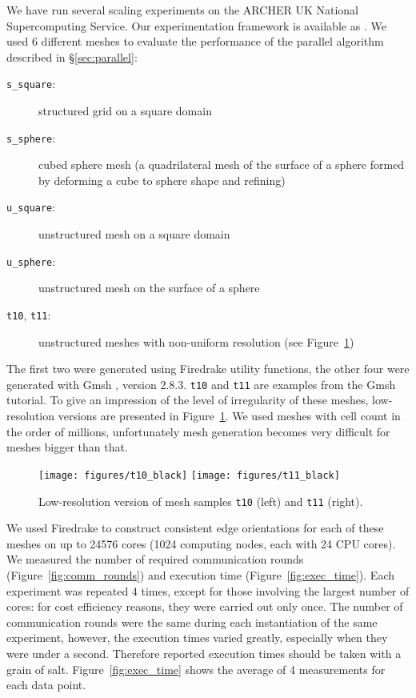 \documentclass[oneeqnum,onethmnum,onefignum,onetabnum]{siamltex1213}
\begin{document}
We have run several scaling experiments on the ARCHER UK National
Supercomputing Service. Our experimentation framework is available as
\cite{miklos_homolya_2015_31190}. We used 6 different meshes to
evaluate the performance of the parallel algorithm described in
\S\ref{sec:parallel}:
\begin{description}
  \item[\texttt{s\_square}:] structured grid on a square domain
  \item[\texttt{s\_sphere}:] cubed sphere mesh (a quadrilateral
    mesh of the surface of a sphere formed by deforming a cube to sphere shape
    and refining)
  \item[\texttt{u\_square}:] unstructured mesh on a square domain
  \item[\texttt{u\_sphere}:] unstructured mesh on the surface of a sphere
  \item[\texttt{t10}, \texttt{t11}:] unstructured meshes with
    non-uniform resolution (see Figure~\ref{fig:t10_t11})
\end{description}
The first two were generated using Firedrake utility functions, the other
four were generated with Gmsh \cite{Geuzaine2009}, version
2.8.3. \texttt{t10} and \texttt{t11} are examples from the Gmsh tutorial. To
give an impression of the level of irregularity of these meshes,
low-resolution versions are presented in Figure~\ref{fig:t10_t11}.
We used meshes with cell count in the order of millions, unfortunately mesh
generation becomes very difficult for meshes bigger than that.

\begin{figure}
  \centering
  \texttt{[image: figures/t10\_black]}
  \quad
  \texttt{[image: figures/t11\_black]}
  \caption{Low-resolution version of mesh samples \texttt{t10} (left) and \texttt{t11} (right).}
  \label{fig:t10_t11}
\end{figure}

We used Firedrake to construct consistent edge orientations for each
of these meshes on up to 24576 cores (1024 computing nodes, each with
24 CPU cores). We measured the number of required communication rounds
(Figure~\ref{fig:comm_rounds}) and execution time
(Figure~\ref{fig:exec_time}). Each experiment was repeated 4 times,
except for those involving the largest number of cores: for cost
efficiency reasons, they were carried out only once. The number of
communication rounds were the same during each instantiation of the
same experiment, however, the execution times varied greatly,
especially when they were under a second. Therefore reported execution
times should be taken with a grain of salt. Figure~\ref{fig:exec_time}
shows the average of 4 measurements for each data point.
\end{document}
